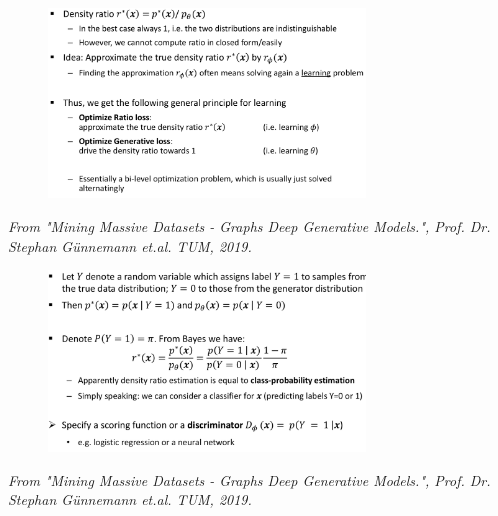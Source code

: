 \documentclass{tum-presentation}
\begin{document}
\begin{frame}
	\begin{figure}
		\centering
		\includegraphics[width=0.75\textwidth,keepaspectratio=true]{tum-resources/images/gan_4.png}
		\label{fig:gan_4}
	\end{figure}
\begin{flushright}
	\textit{	From "Mining Massive Datasets - Graphs Deep Generative Models.", Prof. Dr. Stephan Günnemann et.al. TUM, 2019. }
\end{flushright}
\end{frame}

\begin{frame}
	\begin{figure}
		\centering
		\includegraphics[width=0.75\textwidth,keepaspectratio=true]{tum-resources/images/gan_5.png}
		\label{fig:gan_5}
	\end{figure}
\begin{flushright}
	\textit{	From "Mining Massive Datasets - Graphs Deep Generative Models.", Prof. Dr. Stephan Günnemann et.al. TUM, 2019. }
\end{flushright}
\end{frame}
\end{document}
